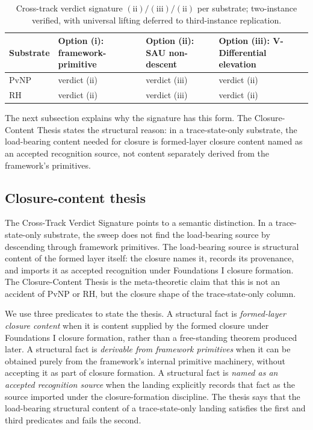 \documentclass[11pt]{article}
\newcommand{\SigPattern}{$\mathrm{(ii)}/\mathrm{(iii)}/\mathrm{(ii)}$}
\theoremstyle{definition}
\begin{document}
\begin{table}[H]
  \centering
  \caption{Cross-track verdict signature \SigPattern{} per substrate; two-instance verified, with universal lifting deferred to third-instance replication.}
  \label{tab:verdict-signature}
  \small
  \begin{tabularx}{\textwidth}{@{}>{\raggedright\arraybackslash}p{}>{\centering\arraybackslash}X>{\centering\arraybackslash}X>{\centering\arraybackslash}X@{}}
    \toprule
    Substrate & Option (i): framework-primitive & Option (ii): SAU non-descent & Option (iii): V-Differential elevation \\
    \midrule
    PvNP & verdict (ii) & verdict (iii) & verdict (ii) \\
    RH & verdict (ii) & verdict (iii) & verdict (ii) \\
    \bottomrule
  \end{tabularx}
\end{table}
 
The next subsection explains why the signature has this form. The
Closure-Content Thesis states the structural reason: in a
trace-state-only substrate, the load-bearing content needed for closure is
formed-layer closure content named as an accepted recognition source, not
content separately derived from the framework's primitives.

\subsection{Closure-content thesis}\label{sec:recognition:closure-content-thesis}

The Cross-Track Verdict Signature points to a semantic distinction. In a
trace-state-only substrate, the sweep does not find the load-bearing
source by descending through framework primitives. The load-bearing source
is structural content of the formed layer itself: the closure names it,
records its provenance, and imports it as accepted recognition under
Foundations I closure formation. The Closure-Content Thesis is the
meta-theoretic claim that this is not an accident of PvNP or RH, but the
closure shape of the trace-state-only column.

We use three predicates to state the thesis. A structural fact is
\emph{formed-layer closure content} when it is content supplied by the
formed closure under Foundations I closure formation, rather than a
free-standing theorem produced later. A structural fact is
\emph{derivable from framework primitives} when it can be obtained purely
from the framework's internal primitive machinery, without accepting it as
part of closure formation. A structural fact is \emph{named as an accepted
recognition source} when the landing explicitly records that fact as the
source imported under the closure-formation discipline. The thesis says
that the load-bearing structural content of a trace-state-only landing
satisfies the first and third predicates and fails the second.
\end{document}
